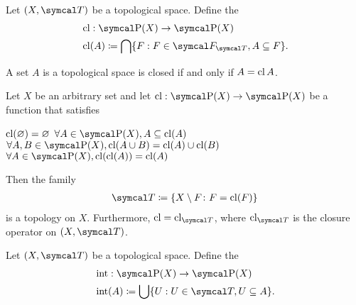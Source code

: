 \begin{definition}\label{def:closure_operator}\cite[33]{Engelking1989}
  Let \( (X, \Cal{T}) \) be a topological space. Define the 
  \begin{align*}
    &\Cl: \Power(X) \to \Power(X) \\
    &\Cl(A) \coloneqq \bigcap \{ F : F \in \Cal{F}_{\Cal{T}}, A \subseteq F \}.
  \end{align*}
\end{definition}

\begin{proposition}\label{thm:set_closed_iff_matches_closure}
  A set \( A \) is a topological space is closed if and only if \( A = \operatorname{cl} A \).
\end{proposition}

\begin{proposition}\label{thm:closure_operator_axioms}\cite[14]{Engelking1989}
  Let \( X \) be an arbitrary set and let \( \Cl: \Power(X) \to \Power(X) \) be a function that satisfies
  \begin{description}
     \( \operatorname{cl}(\varnothing) = \varnothing \)
     \( \forall A \in \Power(X), A \subseteq \Cl(A) \)
     \( \forall A, B \in \Power(X), \Cl(A \cup B) = \Cl(A) \cup \Cl(B) \)
     \( \forall A \in \Power(X), \Cl(\Cl(A)) = \Cl(A) \)
  \end{description}

  Then the family
  \begin{align*}
    \Cal{T} \coloneqq \{ X \setminus F \colon F = \Cl(F) \}
  \end{align*}
  is a topology on \( X \). Furthermore, \( \Cl = \Cl_{\Cal{T}} \), where \( \Cl_{\Cal{T}} \) is the closure operator on \( (X, \Cal{T}) \).
\end{proposition}

\begin{definition}\label{def:interior_operator}\cite[15]{Engelking1989}
  Let \( (X, \Cal{T}) \) be a topological space. Define the 
  \begin{align*}
    &\Int: \Power(X) \to \Power(X) \\
    &\Int(A) \coloneqq \bigcup \{ U : U \in \Cal{T}, U \subseteq A \}.
  \end{align*}
\end{definition}

